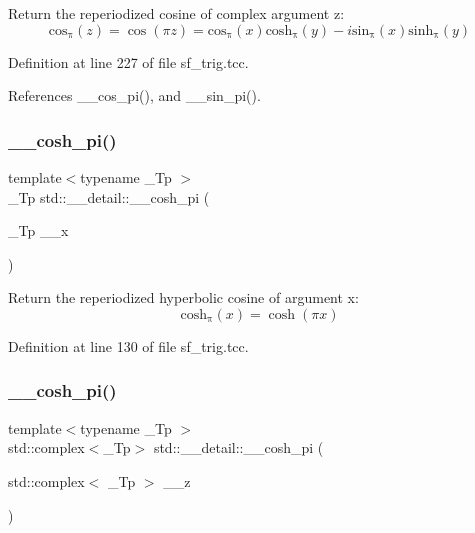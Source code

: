 Return the reperiodized cosine of complex argument z\+: \[ \mathrm{cos_\pi}(z) = \cos(\pi z) = \mathrm{cos_\pi}(x) \mathrm{cosh_\pi}(y) - i \mathrm{sin_\pi}(x) \mathrm{sinh_\pi}(y) \] 

Definition at line 227 of file sf\+\_\+trig.\+tcc.



References \+\_\+\+\_\+cos\+\_\+pi(), and \+\_\+\+\_\+sin\+\_\+pi().

\mbox{\label{namespacestd_1_1____detail_ae6e440447e88191b3cd19daaf7fda96e}} 
\subsubsection{\texorpdfstring{\+\_\+\+\_\+cosh\+\_\+pi()}{\_\_cosh\_pi()}\hspace{0.1cm}{\footnotesize\ttfamily [1/2]}}
{\footnotesize\ttfamily template$<$typename \+\_\+\+Tp $>$ \\
\+\_\+\+Tp std\+::\+\_\+\+\_\+detail\+::\+\_\+\+\_\+cosh\+\_\+pi (\begin{DoxyParamCaption}\item[{\+\_\+\+Tp}]{\+\_\+\+\_\+x }\end{DoxyParamCaption})}

Return the reperiodized hyperbolic cosine of argument x\+: \[ \mathrm{cosh_\pi}(x) = \cosh(\pi x) \] 

Definition at line 130 of file sf\+\_\+trig.\+tcc.

\mbox{\label{namespacestd_1_1____detail_a257e13bd4fa9711a87ea68a783ee40d9}} 
\subsubsection{\texorpdfstring{\+\_\+\+\_\+cosh\+\_\+pi()}{\_\_cosh\_pi()}\hspace{0.1cm}{\footnotesize\ttfamily [2/2]}}
{\footnotesize\ttfamily template$<$typename \+\_\+\+Tp $>$ \\
std\+::complex$<$\+\_\+\+Tp$>$ std\+::\+\_\+\+\_\+detail\+::\+\_\+\+\_\+cosh\+\_\+pi (\begin{DoxyParamCaption}\item[{std\+::complex$<$ \+\_\+\+Tp $>$}]{\+\_\+\+\_\+z }\end{DoxyParamCaption})}

